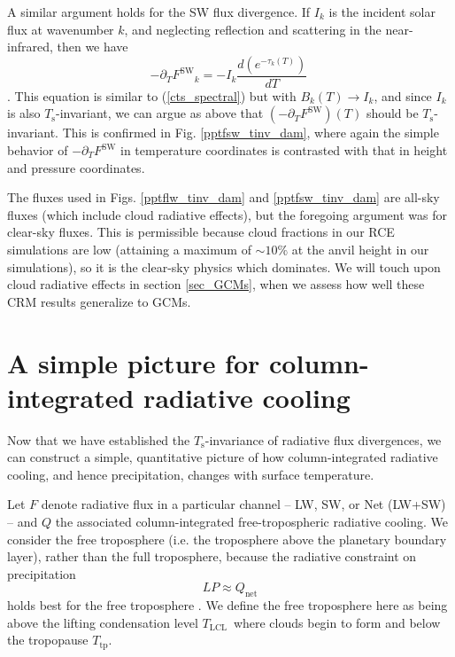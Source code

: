 \documentclass[9pt,twocolumn,twoside,lineno]{pnas-new}
\newcommand{\beqn}{\begin{equation}}
\newcommand{\eeqn}{\end{equation}}
\newcommand{\eqnref}[1]{(\ref{#1})}
\newcommand{\der}[2]{\ensuremath{\frac{d #1}{d #2}}}
\newcommand{\ppt}{\ensuremath{\partial_T}}
\newcommand{\Qnet}{\ensuremath{Q_\mathrm{net}}}
\newcommand{\FSW}{\ensuremath{F^\mathrm{SW}}}
\newcommand{\tauk}{\ensuremath{\tau_k}}
\newcommand{\Ts}{\ensuremath{T_\mathrm{s}}}
\newcommand{\Tlcl}{\ensuremath{T_\mathrm{LCL}}}
\newcommand{\Ttp}{\ensuremath{T_\mathrm{tp}}}
\begin{document}
	A similar argument holds for the SW flux divergence. If $I_k$ is the incident solar flux at wavenumber $k$, and  neglecting reflection and scattering in the  near-infrared, 
then  we have
	\beqn
		-\ppt \FSW_k = - I_k \der{(e^{-\tauk(T)})}{T}
		\
	\eeqn
\cite[][eqn. 9.26]{thomas2002}. This equation is similar to  \eqnref{cts_spectral} but with $B_k(T) \rightarrow I_k$, and since $I_k$ is also \Ts-invariant, we can argue as above that $(-\ppt \FSW)(T)$ should be \Ts-invariant. This is confirmed in Fig. \ref{pptfsw_tinv_dam}, where again the simple behavior of $-\ppt \FSW$ in temperature coordinates is contrasted with that in height and pressure coordinates.



The fluxes used in Figs.  \ref{pptflw_tinv_dam} and \ref{pptfsw_tinv_dam} are all-sky fluxes (which include cloud radiative effects), but the foregoing argument was for clear-sky fluxes. This is permissible because cloud fractions in our RCE simulations are low (attaining a maximum of $\sim 10 \%$ at the anvil height in our simulations), so it is the clear-sky physics which dominates. We will touch upon cloud radiative effects in section \ref{sec_GCMs}, when we assess how well these CRM results generalize to GCMs.
 
		
\section{A simple picture for column-integrated radiative cooling} \label{sec_simple_Q}

Now that we have established  the \Ts-invariance of radiative flux divergences, we can construct a simple, quantitative picture of how column-integrated radiative cooling, and hence precipitation,  changes with surface temperature. 
	
	Let $F$ denote radiative flux in a particular channel -- LW, SW, or Net (LW+SW) -- and $Q$ the associated column-integrated free-tropospheric radiative cooling. We consider  the free troposphere (i.e. the troposphere above the planetary boundary layer), rather than the full troposphere, because the radiative constraint on precipitation 
		\beqn
			LP \approx \Qnet
		\label{p_constraint}
		\eeqn
		 holds best for the free troposphere  \cite{ogorman2012}. We define the free troposphere here as being above the lifting condensation level \Tlcl\ where clouds begin to form and below the tropopause \Ttp.
	
\end{document}
